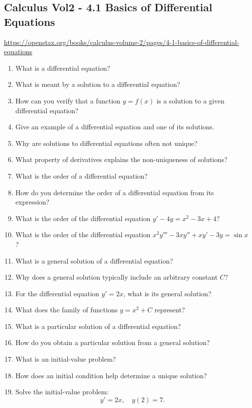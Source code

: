 \subsection{Calculus Vol2 - 4.1 Basics of Differential Equations}

\url{https://openstax.org/books/calculus-volume-2/pages/4-1-basics-of-differential-equations}

\begin{enumerate}
  \item What is a differential equation?
  \item What is meant by a solution to a differential equation?
  \item How can you verify that a function \(y=f(x)\) is a solution to a given differential equation?
  \item Give an example of a differential equation and one of its solutions.
  \item Why are solutions to differential equations often not unique?
  \item What property of derivatives explains the non-uniqueness of solutions?
  \item What is the order of a differential equation?
  \item How do you determine the order of a differential equation from its expression?
  \item What is the order of the differential equation \(y' - 4y = x^{2} - 3x + 4\)?
  \item What is the order of the differential equation \(x^{2} y''' - 3x y'' + x y' - 3y = \sin x\)?
  \item What is a general solution of a differential equation?
  \item Why does a general solution typically include an arbitrary constant \(C\)?
  \item For the differential equation \(y' = 2x\), what is its general solution?
  \item What does the family of functions \(y = x^{2} + C\) represent?
  \item What is a particular solution of a differential equation?
  \item How do you obtain a particular solution from a general solution?
  \item What is an initial-value problem?
  \item How does an initial condition help determine a unique solution?
  \item Solve the initial-value problem:
    \[ y' = 2x, \quad y(2) = 7. \]

\end{enumerate}
